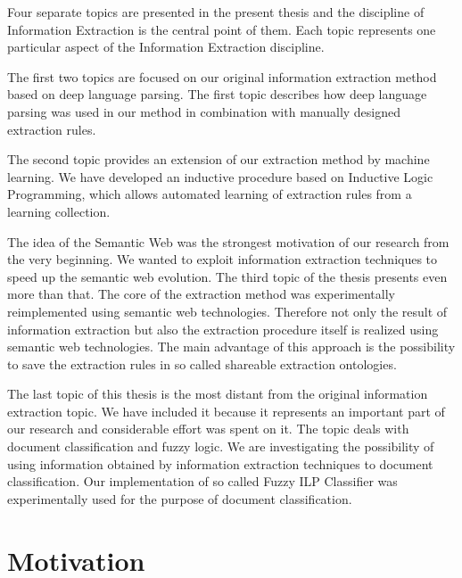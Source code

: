 
\graphicspath{{../img/ch10/}}


Four separate topics are presented in the present thesis and the discipline of Information Extraction is the central point of them. Each topic represents one particular aspect of the Information Extraction discipline.

The first two topics are focused on our original information extraction method based on deep language parsing. The first topic describes how deep language parsing was used in our method in combination with manually designed extraction rules.

The second topic provides an extension of our extraction method by machine learning. We have developed an inductive procedure based on Inductive Logic Programming, which allows automated learning of extraction rules from a learning collection.

The idea of the Semantic Web was the strongest motivation of our research from the very beginning. We wanted to exploit information extraction techniques to speed up the semantic web evolution. The third topic of the thesis presents even more than that. The core of the extraction method was experimentally reimplemented using semantic web technologies. Therefore not only the result of information extraction but also the extraction procedure itself is realized using semantic web technologies. The main advantage of this approach is the possibility to save the extraction rules in so called shareable extraction ontologies.

The last topic of this thesis is the most distant from the original information extraction topic. We have included it because it represents an important part of our research and considerable effort was spent on it. The topic deals with document classification and fuzzy logic. We are investigating the possibility of using information obtained by information extraction techniques to document classification. Our implementation of so called Fuzzy ILP Classifier was experimentally used for the purpose of document classification.

\section{Motivation}


